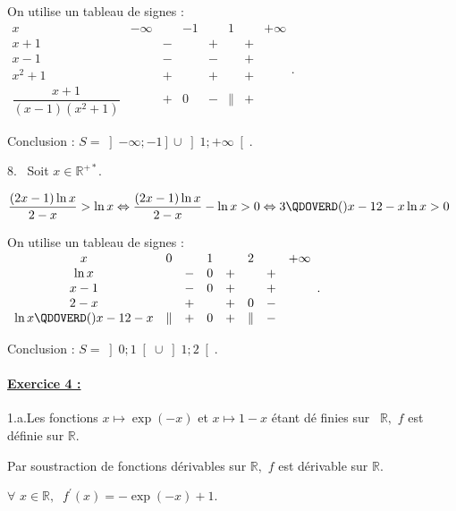 \documentclass{article}
\begin{document}
On utilise un tableau de signes :$%
\begin{array}{cccccccc}
x & -\infty &  & -1 &  & 1 &  & +\infty \\ 
x+1 &  & - &  & + &  & + &  \\ 
x-1 &  & - &  & - &  & + &  \\ 
x^{2}+1 &  & + &  & + &  & + &  \\ 
\dfrac{x+1}{\left( x-1\right) \left( x^{2}+1\right) } &  & + & 0 & - & 
\parallel & + & 
\end{array}%
.$

Conclusion : $S=\left] -\infty ;-1\right] \cup \left] 1;+\infty \right[ .$\
\ 

8. \ Soit $x\in 
\mathbb{R}
^{+\ast }.$

$\dfrac{(2x-1)\ln x}{2-x}>\ln x\Leftrightarrow \dfrac{(2x-1)\ln x}{2-x}-\ln
x>0\Leftrightarrow 3\QDOVERD( ) {x-1}{2-x}\ln x>0$

On utilise un tableau de signes :$%
\begin{array}{cccccccc}
x & 0 &  & 1 &  & 2 &  & +\infty \\ 
\ln x &  & - & 0 & + &  & + &  \\ 
x-1 &  & - & 0 & + &  & + &  \\ 
2-x &  & + &  & + & 0 & - &  \\ 
\ln x\QDOVERD( ) {x-1}{2-x} & \parallel & + & 0 & + & \parallel & - & 
\end{array}%
.$

Conclusion : $S=\left] 0;1\right[ \cup \left] 1;2\right[ .$

\paragraph{\protect\underline{Exercice 4 : }}

1.a.Les fonctions $x\mapsto \exp (-x)$ et $x\mapsto 1-x$ \'{e}tant d\'{e}%
finies sur \ $%
\mathbb{R}
,$ $f$ est d\'{e}finie sur $%
\mathbb{R}
.$

Par soustraction de fonctions d\'{e}rivables sur $%
\mathbb{R}
,$ $f$ est d\'{e}rivable sur $%
\mathbb{R}
.$

$\forall $ $x\in 
\mathbb{R}
,$ $\ f^{\prime }(x)=-\exp (-x)+1.$
\end{document}
